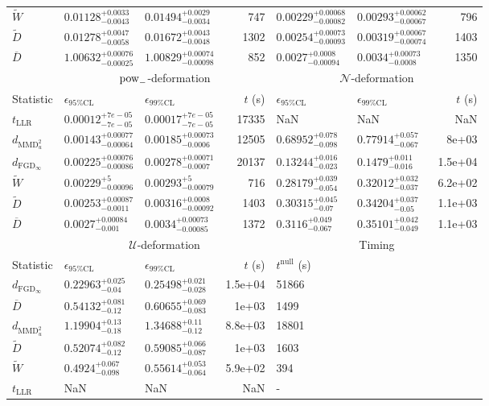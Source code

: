 \begin{tabular}{l|llr|llr}
	$\widetilde{W}$ & $0.01128_{-0.0043}^{+0.0033}$ & $0.01494_{-0.0034}^{+0.0029}$ & 747 & $0.00229_{-0.00082}^{+0.00068}$ & $0.00293_{-0.00067}^{+0.00062}$ & 796 \\
	$\widetilde{D}$ & $0.01278_{-0.0058}^{+0.0047}$ & $0.01672_{-0.0048}^{+0.0043}$ & 1302 & $0.00254_{-0.00093}^{+0.00073}$ & $0.00319_{-0.00074}^{+0.00067}$ & 1403 \\
	$\overline{D}$ & $1.00632_{-0.00025}^{+0.00076}$ & $1.00829_{-0.00098}^{+0.00074}$ & 852 & $0.0027_{-0.00094}^{+0.0008}$ & $0.0034_{-0.0008}^{+0.00073}$ & 1350 \\
	\toprule
	\multicolumn{1}{c}{} & \multicolumn{3}{c}{$\rm{pow}_{-}$-deformation} & \multicolumn{3}{c}{$\mathcal{N}$-deformation} \\
	Statistic & $\epsilon_{95\%\mathrm{CL}}$ & $\epsilon_{99\%\mathrm{CL}}$ & $t$ (s) & $\epsilon_{95\%\mathrm{CL}}$ & $\epsilon_{99\%\mathrm{CL}}$ & $t$ (s) \\
	\midrule
	$t_{\mathrm{LLR}}$ & $0.00012_{-7e-05}^{+7e-05}$ & $0.00017_{-7e-05}^{+7e-05}$ & 17335 & NaN & NaN & NaN \\
	$d_{\mathrm{MMD}^{2}_{u}}$ & $0.00143_{-0.00064}^{+0.00077}$ & $0.00185_{-0.0006}^{+0.00073}$ & 12505 & $0.68952_{-0.098}^{+0.078}$ & $0.77914_{-0.067}^{+0.057}$ & 8e+03 \\
	$d_{\mathrm{FGD}_{\infty}}$ & $0.00225_{-0.00086}^{+0.00076}$ & $0.00278_{-0.0007}^{+0.00071}$ & 20137 & $0.13244_{-0.023}^{+0.016}$ & $0.1479_{-0.016}^{+0.011}$ & 1.5e+04 \\
	$\widetilde{W}$ & $0.00229_{-0.00096}^{+5}$ & $0.00293_{-0.00079}^{+5}$ & 716 & $0.28179_{-0.054}^{+0.039}$ & $0.32012_{-0.037}^{+0.032}$ & 6.2e+02 \\
	$\widetilde{D}$ & $0.00253_{-0.0011}^{+0.00087}$ & $0.00316_{-0.00092}^{+0.0008}$ & 1403 & $0.30315_{-0.07}^{+0.045}$ & $0.34204_{-0.05}^{+0.037}$ & 1.1e+03 \\
	$\overline{D}$ & $0.0027_{-0.001}^{+0.00084}$ & $0.0034_{-0.00085}^{+0.00073}$ & 1372 & $0.3116_{-0.067}^{+0.049}$ & $0.35101_{-0.049}^{+0.042}$ & 1.1e+03 \\
	\toprule
	\multicolumn{1}{c}{} & \multicolumn{3}{c}{$\mathcal{U}$-deformation} & \multicolumn{3}{c}{Timing} \\
	Statistic & $\epsilon_{95\%\mathrm{CL}}$ & $\epsilon_{99\%\mathrm{CL}}$ & $t$ (s) & $t^{\mathrm{null}}$ (s) \\
	\midrule
	$d_{\mathrm{FGD}_{\infty}}$ & $0.22963_{-0.04}^{+0.025}$ & $0.25498_{-0.028}^{+0.021}$ & 1.5e+04 & 51866 \\
	$\overline{D}$ & $0.54132_{-0.12}^{+0.081}$ & $0.60655_{-0.083}^{+0.069}$ & 1e+03 & 1499 \\
	$d_{\mathrm{MMD}^{2}_{u}}$ & $1.19904_{-0.18}^{+0.13}$ & $1.34688_{-0.12}^{+0.11}$ & 8.8e+03 & 18801 \\
	$\widetilde{D}$ & $0.52074_{-0.12}^{+0.082}$ & $0.59085_{-0.087}^{+0.066}$ & 1e+03 & 1603 \\
	$\widetilde{W}$ & $0.4924_{-0.098}^{+0.067}$ & $0.55614_{-0.064}^{+0.053}$ & 5.9e+02 & 394 \\
	$t_{\mathrm{LLR}}$ & NaN & NaN & NaN & - \\
	\bottomrule
\end{tabular}